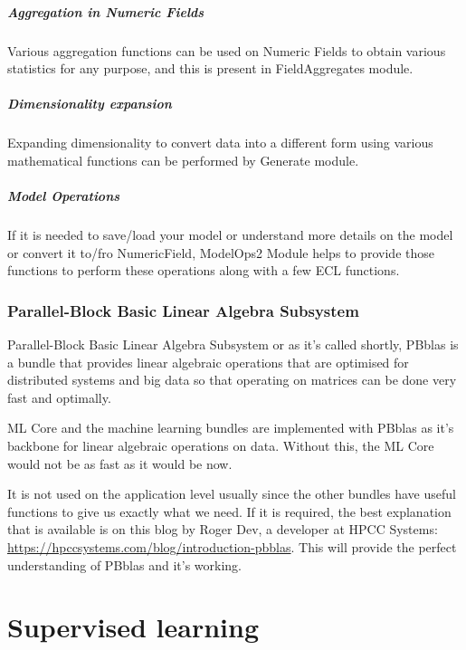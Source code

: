 \documentclass[a4paper,oneside,12pt]{book}
\begin{document}
\subsubsection{Aggregation in Numeric Fields}

Various aggregation functions can be used on Numeric Fields to obtain various statistics for any purpose, and this is present in FieldAggregates module.

\subsubsection{Dimensionality expansion}

Expanding dimensionality to convert data into a different form using various mathematical functions can be performed by Generate module.

\subsubsection{Model Operations}

If it is needed to save/load your model or understand more details on the model or convert it to/fro NumericField, ModelOps2 Module helps to provide those functions to perform these operations along with a few ECL functions.

\section{Parallel-Block Basic Linear Algebra Subsystem}\label{sec:pbblas}

Parallel-Block Basic Linear Algebra Subsystem or as it's called shortly, PBblas is a bundle that provides linear algebraic operations that are optimised for distributed systems and big data so that operating on matrices can be done very fast and optimally. 

ML Core and the machine learning bundles are implemented with PBblas as it's backbone for linear algebraic operations on data. Without this, the ML Core would not be as fast as it would be now. 

It is not used on the application level usually since the other bundles have useful functions to give us exactly what we need. If it is required, the best explanation that is available is on this blog by Roger Dev, a developer at HPCC Systems: \url{https://hpccsystems.com/blog/introduction-pbblas}. This will provide the perfect understanding of PBblas and it's working.

\part{Supervised learning}\label{part:supe}
\end{document}
